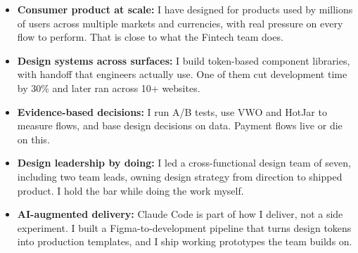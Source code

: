 \documentclass[]{cover-fira}
\begin{document}


\currentdate{\today}



{\raggedright{}\fontsize{11pt}{13pt}\selectfont
\begin{itemize}
    \item \textbf{Consumer product at scale:} I have designed for products used by millions of users across multiple markets and currencies, with real pressure on every flow to perform. That is close to what the Fintech team does.
    \item \textbf{Design systems across surfaces:} I build token-based component libraries, with handoff that engineers actually use. One of them cut development time by 30\% and later ran across 10+ websites.
    \item \textbf{Evidence-based decisions:} I run A/B tests, use VWO and HotJar to measure flows, and base design decisions on data. Payment flows live or die on this.
    \item \textbf{Design leadership by doing:} I led a cross-functional design team of seven, including two team leads, owning design strategy from direction to shipped product. I hold the bar while doing the work myself.
    \item \textbf{AI-augmented delivery:} Claude Code is part of how I deliver, not a side experiment. I built a Figma-to-development pipeline that turns design tokens into production templates, and I ship working prototypes the team builds on.
\end{itemize}\par}
\vspace{6pt}
\end{document}
